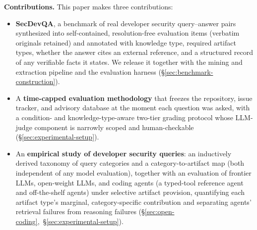 \noindent\textbf{Contributions.} This paper makes three contributions:
\begin{itemize}
  \item \textbf{SecDevQA}, a benchmark of real developer security query--answer pairs synthesized into self-contained, resolution-free evaluation items (verbatim originals retained) and annotated with knowledge type, required artifact types, whether the answer cites an external reference, and a structured record of any verifiable facts it states. We release it together with the mining and extraction pipeline and the evaluation harness (\S\ref{sec:benchmark-construction}).
  \item A \textbf{time-capped evaluation methodology} that freezes the repository, issue tracker, and advisory database at the moment each question was asked, with a condition- and knowledge-type-aware two-tier grading protocol whose LLM-judge component is narrowly scoped and human-checkable (\S\ref{sec:experimental-setup}).
  \item An \textbf{empirical study of developer security queries}: an inductively derived taxonomy of query categories and a category-to-artifact map (both independent of any model evaluation), together with an evaluation of frontier LLMs, open-weight LLMs, and coding agents (a typed-tool reference agent and off-the-shelf agents) under selective artifact provision, quantifying each artifact type's marginal, category-specific contribution and separating agents' retrieval failures from reasoning failures (\S\ref{sec:open-coding},~\S\ref{sec:experimental-setup}).
\end{itemize}
